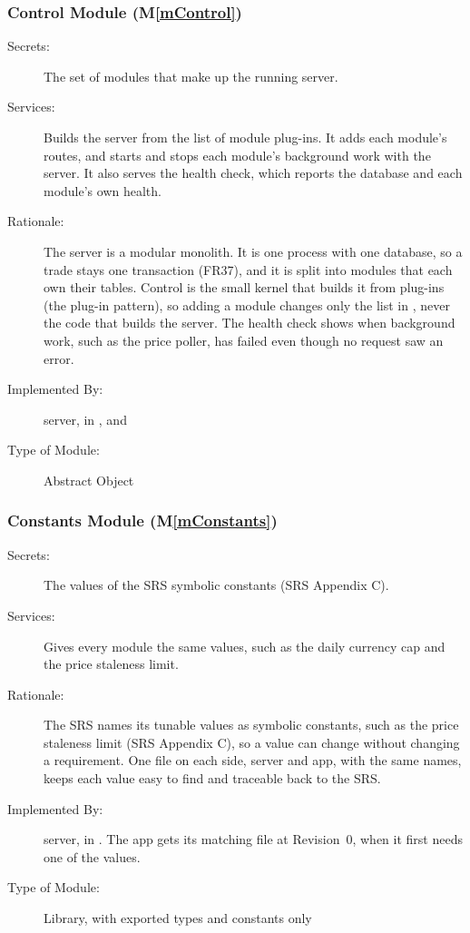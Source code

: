 \documentclass[12pt, titlepage]{article}
\newcommand{\mref}[1]{M\ref{#1}}
\begin{document}
\subsubsection{Control Module (\mref{mControl})}

\begin{description}
\item[Secrets:] The set of modules that make up the running server.
\item[Services:] Builds the server from the list of module plug-ins. It adds each module's routes, and starts and stops each module's background work with the server. It also serves the health check, which reports the database and each module's own health.
\item[Rationale:] The server is a modular monolith. It is one process with one database, so a trade stays one transaction (FR37), and it is split into modules that each own their tables. Control is the small kernel that builds it from plug-ins (the plug-in pattern), so adding a module changes only the list in , never the code that builds the server. The health check shows when background work, such as the price poller, has failed even though no request saw an error.
\item[Implemented By:] \progname{} server, in ,  and 
\item[Type of Module:] Abstract Object
\end{description}

\subsubsection{Constants Module (\mref{mConstants})}

\begin{description}
\item[Secrets:] The values of the SRS symbolic constants (SRS Appendix C).
\item[Services:] Gives every module the same values, such as the daily currency cap and the price staleness limit.
\item[Rationale:] The SRS names its tunable values as symbolic constants, such as the price staleness limit (SRS Appendix C), so a value can change without changing a requirement. One file on each side, server and app, with the same names, keeps each value easy to find and traceable back to the SRS.
\item[Implemented By:] \progname{} server, in . The app gets its matching file at Revision~0, when it first needs one of the values.
\item[Type of Module:] Library, with exported types and constants only
\end{description}
\end{document}
